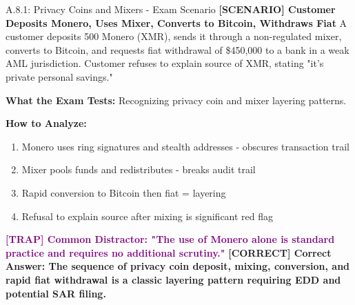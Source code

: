 \documentclass[11pt,a4paper]{beamer}
\newcommand{\trap}[1]{\textcolor{purple}{\textbf{[TRAP] #1}}}
\newcommand{\correct}[1]{\textcolor{green!50!black}{\textbf{[CORRECT] #1}}}
\newcommand{\scenario}[1]{\textcolor{blue!70!black}{\textbf{[SCENARIO] #1}}}
\begin{document}
	\begin{frame}{A.8.1: Privacy Coins and Mixers - Exam Scenario}
		\scenario{Customer Deposits Monero, Uses Mixer, Converts to Bitcoin, Withdraws Fiat}
		A customer deposits 500 Monero (XMR), sends it through a non-regulated mixer, converts to Bitcoin, and requests fiat withdrawal of \$450,000 to a bank in a weak AML jurisdiction. Customer refuses to explain source of XMR, stating "it's private personal savings."
		
		\vspace{0.1cm}
		\textbf{What the Exam Tests:} Recognizing privacy coin and mixer layering patterns.
		
		\vspace{0.1cm}
		\textbf{How to Analyze:}
		\begin{enumerate}
			\item Monero uses ring signatures and stealth addresses - obscures transaction trail
			\item Mixer pools funds and redistributes - breaks audit trail
			\item Rapid conversion to Bitcoin then fiat = layering
			\item Refusal to explain source after mixing is significant red flag
		\end{enumerate}
		
		\trap{Common Distractor: "The use of Monero alone is standard practice and requires no additional scrutiny."}
		\correct{Correct Answer: The sequence of privacy coin deposit, mixing, conversion, and rapid fiat withdrawal is a classic layering pattern requiring EDD and potential SAR filing.}
	\end{frame}
	
\end{document}
